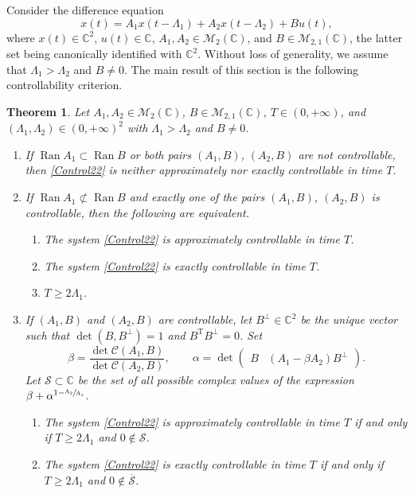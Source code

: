 \documentclass[10pt]{amsart}
\theoremstyle{plain}
\newtheorem{theo}{Theorem}[section]
\theoremstyle{definition}
\DeclareMathOperator{\range}{Ran}
\newcommand{\transp}{{\scriptscriptstyle\mathrm{T}}}
\begin{document}
Consider the difference equation
\begin{equation}
\label{Control22}
x(t) = A_1 x(t - \Lambda_1) + A_2 x(t - \Lambda_2) + B u(t),
\end{equation}
where $x(t) \in \mathbb C^2$, $u(t) \in \mathbb C$, $A_1, A_2 \in \mathcal M_2(\mathbb C)$, and $B \in \mathcal M_{2, 1}(\mathbb C)$, the latter set being canonically identified with $\mathbb C^2$. Without loss of generality, we assume that $\Lambda_1 > \Lambda_2$ and $B \neq 0$. The main result of this section is the following controllability criterion.

\begin{theo}
\label{MainTheo22}
Let $A_1, A_2 \in \mathcal M_2(\mathbb C)$, $B \in \mathcal M_{2, 1}(\mathbb C)$, $T \in (0, +\infty)$, and $(\Lambda_1, \Lambda_2) \in (0, +\infty)^2$ with $\Lambda_1 > \Lambda_2$ and $B \neq 0$.
\begin{enumerate}
\item\label{MainTheoA1BNonContr} If $\range A_1 \subset \range B$ or both pairs $(A_1, B)$, $(A_2, B)$ are not controllable, then \eqref{Control22} is neither approximately nor exactly controllable in time $T$.
\item\label{MainTheoA2BNonContr} If $\range A_1 \not\subset \range B$ and exactly one of the pairs $(A_1, B)$, $(A_2, B)$ is controllable, then the following are equivalent.
\begin{enumerate}
\item The system \eqref{Control22} is approximately controllable in time $T$.
\item The system \eqref{Control22} is exactly controllable in time $T$.
\item $T \geq 2 \Lambda_{1}$.
\end{enumerate}
\item\label{MainTheoA1A2Contr} If $(A_1, B)$ and $(A_2, B)$ are controllable, let $B^\perp \in \mathbb C^2$ be the unique vector such that $\det(B, B^\perp)  = 1$ and $B^\transp B^\perp = 0$. Set
\begin{equation}
\label{DefAlphaBeta}
\beta = \frac{\det \mathcal C(A_1, B)}{\det \mathcal C(A_2, B)}, \qquad \alpha = \det \begin{pmatrix}B & (A_1 - \beta A_2) B^\perp\end{pmatrix}.
\end{equation}
Let $\mathcal S \subset \mathbb C$ be the set of all possible complex values of the expression $\beta + \alpha^{1 - \sfrac{\Lambda_{2}}{\Lambda_{1}}}$.
\begin{enumerate}
\item\label{MainTheoApprox} The system \eqref{Control22} is approximately controllable in time $T$ if and only if $T \geq 2 \Lambda_{1}$ and $0 \notin \mathcal S$.
\item\label{MainTheoExact} The system \eqref{Control22} is exactly controllable in time $T$ if and only if $T \geq 2 \Lambda_{1}$ and $0 \notin \overline{\mathcal S}$.
\end{enumerate}
\end{enumerate}
\end{theo}
\end{document}
